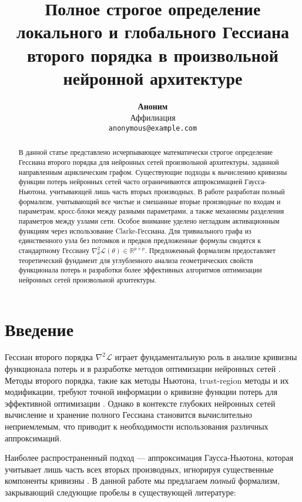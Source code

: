 \documentclass[11pt]{article}
\title{Полное строгое определение локального и глобального Гессиана второго порядка в произвольной нейронной
архитектуре}
\author{
  \textbf{Аноним} \\
  Аффилиация\\
  \texttt{anonymous@example.com} \\
}
\begin{document}
\sloppy
\maketitle

\begin{abstract}
  В данной статье представлено исчерпывающее математически строгое определение Гессиана второго порядка для
  нейронных сетей произвольной архитектуры, заданной направленным ациклическим графом. Существующие подходы к
  вычислению кривизны функции потерь нейронных сетей часто ограничиваются аппроксимацией Гаусса-Ньютона,
  учитывающей лишь часть вторых производных. В работе разработан полный формализм, учитывающий все чистые и
  смешанные вторые производные по входам и параметрам, кросс-блоки между разными параметрами, а также
  механизмы разделения параметров между узлами сети. Особое внимание уделено негладким активационным функциям
  через использование Clarke-Гессиана. Для тривиального графа из единственного узла без потомков и предков
  предложенные формулы сводятся к стандартному Гессиану $\nabla^2_\theta\mathcal
  L(\theta)\in\mathbb{R}^{p\times p}$. Предложенный формализм предоставляет теоретический фундамент для
  углубленного анализа геометрических свойств функционала потерь и разработки более эффективных алгоритмов
  оптимизации нейронных сетей произвольной архитектуры.
\end{abstract}

\section{Введение}
Гессиан второго порядка $\nabla^2\mathcal L$ играет фундаментальную роль в анализе кривизны функционала
потерь и в разработке методов оптимизации нейронных сетей \citep{martens2014optimizing,
pascanu2013revisiting}. Методы второго порядка, такие как методы Ньютона, trust-region методы и их
модификации, требуют точной информации о кривизне функции потерь для эффективной оптимизации
\citep{nocedal2006numerical}. Однако в контексте глубоких нейронных сетей вычисление и хранение полного
Гессиана становится вычислительно неприемлемым, что приводит к необходимости использования различных аппроксимаций.

Наиболее распространенный подход — аппроксимация Гаусса-Ньютона, которая учитывает лишь часть всех вторых
производных, игнорируя существенные компоненты кривизны \citep{schraudolph2002fast, martens2010deep}. В
данной работе мы предлагаем \emph{полный} формализм, закрывающий следующие пробелы в существующей литературе:
\end{document}
